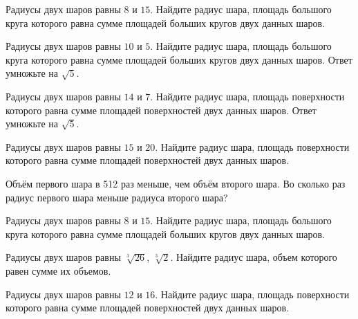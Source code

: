 \documentclass[a4paper]{article}
\begin{document}
\begin{taskBN}{41}
Радиусы двух шаров равны $8$ и $15$. Найдите радиус шара, площадь большого круга которого равна сумме площадей больших кругов двух данных шаров.
\end{taskBN}

\begin{taskBN}{42}
Радиусы двух шаров равны $10$ и $5$. Найдите радиус шара, площадь большого круга которого равна сумме площадей больших кругов двух данных шаров. Ответ умножьте на $\sqrt{5}$.
\end{taskBN}

\begin{taskBN}{43}
Радиусы двух шаров равны $14$ и $7$. Найдите радиус шара, площадь поверхности которого равна сумме площадей поверхностей двух данных шаров. Ответ умножьте на $\sqrt{5}$.
\end{taskBN}

\begin{taskBN}{44}
Радиусы двух шаров равны $15$ и $20$. Найдите радиус шара, площадь поверхности которого равна сумме площадей поверхностей двух данных шаров.
\end{taskBN}

\begin{taskBN}{45}
Объём первого шара в 512 раз меньше, чем объём второго шара. Во сколько раз радиус первого шара меньше радиуса второго шара?
\end{taskBN}

\begin{taskBN}{46}
Радиусы двух шаров равны $8$ и $15$. Найдите радиус шара, площадь большого круга которого равна сумме площадей больших кругов двух данных шаров.
\end{taskBN}

\begin{taskBN}{47}
Радиусы двух шаров равны $\sqrt[3]{26}$, $\sqrt[3]{2}$. Найдите радиус шара, объем которого равен сумме их объемов.
\end{taskBN}

\begin{taskBN}{48}
Радиусы двух шаров равны $12$ и $16$. Найдите радиус шара, площадь поверхности которого равна сумме площадей поверхностей двух данных шаров.
\end{taskBN}
\end{document}
